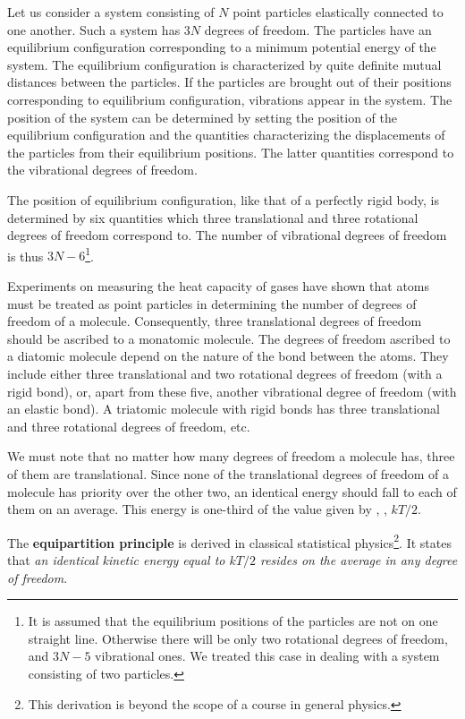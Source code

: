 Let us consider a system consisting of $N$ point particles elastically connected to one another. Such a system has $3N$ degrees of freedom. The particles have an equilibrium configuration corresponding to a minimum potential energy of the system. The equilibrium configuration is characterized by quite definite mutual distances between the particles. If the particles are brought out of their positions corresponding to equilibrium configuration, vibrations appear in the system. The position of the system can be determined by setting the position of the equilibrium configuration and the quantities characterizing the displacements of the particles from their equilibrium positions. The latter quantities correspond to the vibrational degrees of freedom.

The position of equilibrium configuration, like that of a perfectly rigid body, is determined by six quantities which three translational and three rotational degrees of freedom correspond to. The number of vibrational degrees of freedom is thus $3N-6$\footnote{It is assumed that the equilibrium positions of the particles are not on one straight line. Otherwise there will be only two rotational degrees of freedom, and $3N-5$ vibrational ones. We treated this case in dealing with a system consisting of two particles.}.

Experiments on measuring the heat capacity of gases have shown that atoms must be treated as point particles in determining the number of degrees of freedom of a molecule. Consequently, three translational degrees of freedom should be ascribed to a monatomic molecule. The degrees of freedom ascribed to a diatomic molecule depend on the nature of the bond between the atoms. They include either three translational and two rotational degrees of freedom (with a rigid bond), or, apart from these five, another vibrational degree of freedom (with an elastic bond). A triatomic molecule with rigid bonds has three translational and three rotational degrees of freedom, etc.

We must note that no matter how many degrees of freedom a molecule has, three of them are translational. Since none of the translational degrees of freedom of a molecule has priority over the other two, an identical energy should fall to each of them on an average. This energy is one-third of the value given by , \ie, $kT/2$.

The \textbf{equipartition principle} is derived in classical statistical physics\footnote{This derivation is beyond the scope of a course in general physics.}. It states that \textit{an identical kinetic energy equal to $kT/2$ resides on the average in any degree of freedom}.

